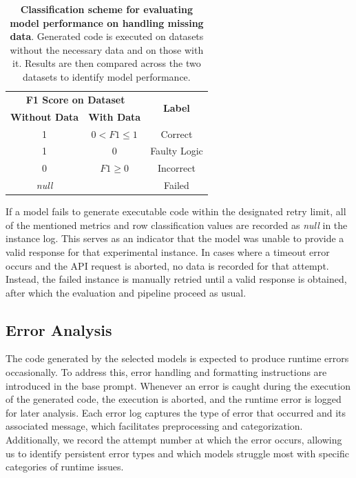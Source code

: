 \documentclass{DESSThesis}
\begin{document}
\begin{table}[ht]
    \centering
    \renewcommand{\arraystretch}{1.2}
    \setlength{\tabcolsep}{12pt}
    \small
    \begin{tabular}{c c c}
    \toprule
    \multicolumn{2}{c}{\textbf{F1 Score on Dataset}} & \multirow{2}{*}{\textbf{Label}} \\
    \cmidrule(lr){1-2}
    \textbf{Without Data} & \textbf{With Data} & \\
    \midrule
    1 & $0 < F1 \leq 1$ & Correct \\
    \rowcolor{gray!10} 
    1 & $0$ & Faulty Logic \\
    0 & $F1 \geq 0$ & Incorrect \\
    \rowcolor{gray!10} 
    \textit{null} &  & Failed \\
    \bottomrule
    \end{tabular}
    \caption[Classification scheme for evaluating model performance on handling missing data]{\textbf{Classification scheme for evaluating model performance on handling missing data}. Generated code is executed on datasets without the necessary data and on those with it. Results are then compared across the two datasets to identify model performance.}
    \label{tab:nodata_classification}
\end{table}

If a model fails to generate executable code within the designated retry limit, all of the mentioned metrics and row classification values are recorded as \emph{null} in the instance log. This serves as an indicator that the model was unable to provide a valid response for that experimental instance. In cases where a timeout error occurs and the API request is aborted, no data is recorded for that attempt. Instead, the failed instance is manually retried until a valid response is obtained, after which the evaluation and pipeline proceed as usual.

\subsection{Error Analysis}

The code generated by the selected models is expected to produce runtime errors occasionally. To address this, error handling and formatting instructions are introduced in the base prompt. Whenever an error is caught during the execution of the generated code, the execution is aborted, and the runtime error is logged for later analysis. Each error log captures the type of error that occurred and its associated message, which facilitates preprocessing and categorization. Additionally, we record the attempt number at which the error occurs, allowing us to identify persistent error types and which models struggle most with specific categories of runtime issues.
\end{document}
